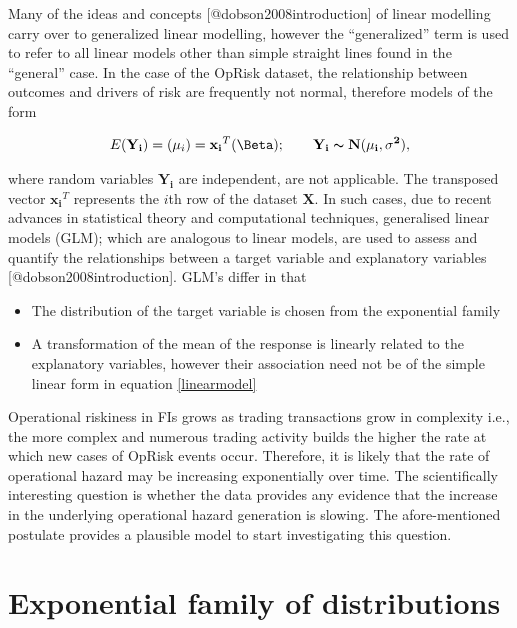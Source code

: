 \documentclass[]{article}
\begin{document}
Many of the ideas and concepts {[}@dobson2008introduction{]} of linear
modelling carry over to generalized linear modelling, however the
``generalized'' term is used to refer to all linear models other than
simple straight lines found in the ``general'' case. In the case of the
OpRisk dataset, the relationship between outcomes and drivers of risk
are frequently not normal, therefore models of the form

\singlespacing

\begin{eqnarray}\label{linearmodel}
E(\mathbf{Y_i}) = \mathbf(\mu_i) = \mathbf{x_i}^T\mathbf(\Beta); \qquad \mathbf{Y_i} \thicksim \mathbf{N(\mu_i, \sigma^2)},
\end{eqnarray} \doublespacing

where random variables \(\mathbf{Y_i}\) are independent, are not
applicable. The transposed vector \(\mathbf{x_i}^T\) represents the
\(i\)th row of the dataset \(\mathbf{X}\). In such cases, due to recent
advances in statistical theory and computational techniques, generalised
linear models (GLM); which are analogous to linear models, are used to
assess and quantify the relationships between a target variable and
explanatory variables {[}@dobson2008introduction{]}. GLM's differ in
that

\begin{itemize}
\item The distribution of the target variable is chosen from the exponential family
\item A transformation of the mean of the response is linearly related to the explanatory variables, however their association need not be of the simple linear form in equation \ref{linearmodel}
\end{itemize}

Operational riskiness in FIs grows as trading transactions grow in
complexity i.e., the more complex and numerous trading activity builds
the higher the rate at which new cases of OpRisk events occur.
Therefore, it is likely that the rate of operational hazard may be
increasing exponentially over time. The scientifically interesting
question is whether the data provides any evidence that the increase in
the underlying operational hazard generation is slowing. The
afore-mentioned postulate provides a plausible model to start
investigating this question.\medskip

\section{Exponential family of distributions}
\label{sec: Exponential family of distributions}
\end{document}
